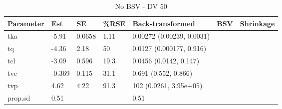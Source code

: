 \begin{table}
\centering\centering
\caption{No BSV - DV 50}
\centering
\fontsize{8}{10}\selectfont
\begin{tabular}[t]{lllllll}
\toprule
\textbf{Parameter} & \textbf{Est} & \textbf{SE} & \textbf{\%RSE} & \textbf{Back-transformed} & \textbf{BSV} & \textbf{Shrinkage}\\
\midrule
tka & -5.91 & 0.0658 & 1.11 & 0.00272 (0.00239, 0.0031) &  & \\
\midrule
tq & -4.36 & 2.18 & 50 & 0.0127 (0.000177, 0.916) &  & \\
\midrule
tcl & -3.09 & 0.596 & 19.3 & 0.0456 (0.0142, 0.147) &  & \\
\midrule
tvc & -0.369 & 0.115 & 31.1 & 0.691 (0.552, 0.866) &  & \\
\midrule
tvp & 4.62 & 4.22 & 91.3 & 102 (0.0261, 3.95e+05) &  & \\
\midrule
prop.sd & 0.51 &  &  & 0.51 &  & \\
\bottomrule
\end{tabular}
\end{table}